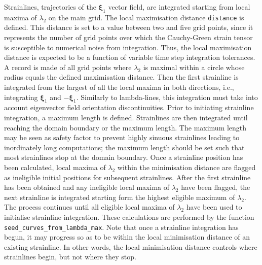 \documentclass{article}
\begin{document}
Strainlines, trajectories of the $\boldsymbol \xi_1$ vector field, are integrated starting from local maxima of $\lambda_2$ on the main grid. 
The local maximisation distance \lstinline!distance! is defined. This distance is set to a value between two and five grid points, since it represents the number of grid points over which the Cauchy-Green strain tensor is susceptible to numerical noise from integration. Thus, the local maximisation distance is expected to be a function of variable time step integration tolerances. A record is made of all grid points where $\lambda_2$ is maximal within a circle whose radius equals the defined maximisation distance. 
Then the first strainline is integrated from the largest of all the local maxima in both directions, i.e., integrating $\boldsymbol \xi_1$ and $-\boldsymbol \xi_1$. Similarly to lambda-lines, this integration must take into account eigenvector field orientation discontinuities. Prior to initiating strainline integration, a maximum length is defined. Strainlines are then integrated until reaching the domain boundary or the maximum length. The maximum length may be seen as safety factor to prevent highly sinuous strainlines leading to inordinately long computations; the maximum length should be set such that most strainlines stop at the domain boundary. 
Once a strainline position has been calculated, local maxima of $\lambda_2$ within the minimisation distance are flagged as ineligible initial positions for subsequent strainlines. After the first strainline has been obtained and any ineligible local maxima of $\lambda_2$ have been flagged, the next strainline is integrated starting form the highest eligible maximum of $\lambda_2$. The process continues until all eligible local maxima of $\lambda_2$ have been used to initialise strainline integration. 
These calculations are performed by the function \lstinline!seed_curves_from_lambda_max!.
Note that once a strainline integration has begun, it may progress so as to be within the local minimisation distance of an existing strainline. In other words, the local minimisation distance controls where strainlines begin, but not where they stop.
\end{document}
